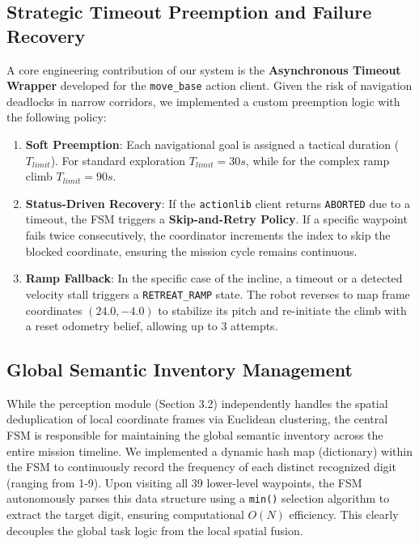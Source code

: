 \documentclass[11pt, a4paper]{article}
\begin{document}
\subsection{Strategic Timeout Preemption and Failure Recovery}
A core engineering contribution of our system is the \textbf{Asynchronous Timeout Wrapper} developed for the \texttt{move\_base} action client. Given the risk of navigation deadlocks in narrow corridors, we implemented a custom preemption logic with the following policy:
\begin{enumerate}
    \item \textbf{Soft Preemption}: Each navigational goal is assigned a tactical duration ($T_{limit}$). For standard exploration $T_{limit}=30s$, while for the complex ramp climb $T_{limit}=90s$.
    \item \textbf{Status-Driven Recovery}: If the \texttt{actionlib} client returns \texttt{ABORTED} due to a timeout, the FSM triggers a \textbf{Skip-and-Retry Policy}. If a specific waypoint fails twice consecutively, the coordinator increments the index to skip the blocked coordinate, ensuring the mission cycle remains continuous.
    \item \textbf{Ramp Fallback}: In the specific case of the incline, a timeout or a detected velocity stall triggers a \texttt{RETREAT\_RAMP} state. The robot reverses to map frame coordinates $(24.0, -4.0)$ to stabilize its pitch and re-initiate the climb with a reset odometry belief, allowing up to 3 attempts.
\end{enumerate}

\subsection{Global Semantic Inventory Management}
While the perception module (Section 3.2) independently handles the spatial deduplication of local coordinate frames via Euclidean clustering, the central FSM is responsible for maintaining the global semantic inventory across the entire mission timeline. We implemented a dynamic hash map (dictionary) within the FSM to continuously record the frequency of each distinct recognized digit (ranging from 1-9). Upon visiting all 39 lower-level waypoints, the FSM autonomously parses this data structure using a \texttt{min()} selection algorithm to extract the target digit, ensuring computational $O(N)$ efficiency. This clearly decouples the global task logic from the local spatial fusion.
\end{document}
